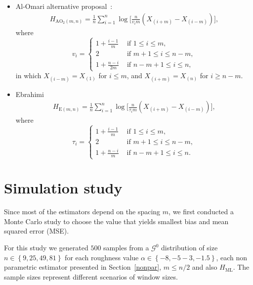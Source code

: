 \documentclass[journal]{IEEEtran}
\begin{document}
\begin{itemize}
		\item Al-Omari alternative proposal~\cite{AlOmari2016}:
		\label{MH}
		\begin{align}
			H_{\text{AO}_2(m,n)}=\frac{1}{n} \sum_{i=1}^{n} \log \Big[\frac{n}{v_{i} m}\left(X_{(i+m)}-X_{(i-m)}\right)\Big],
		\end{align}
		where
		\begin{equation*}
			v_{i}=\begin{cases}
				1+\frac{i-1}{m} & \text{ if }1 \leq i \leq m, \\
				2 & \text{ if } m+1 \leq i \leq n-m, \\
				1+\frac{n-i}{2 m} & \text{ if } n-m+1 \leq i \leq n,
			\end{cases}
		\end{equation*}
		in which $X_{(i-m)}=X_{(1)}$ for $i \leq m$, and $X_{(i+m)}=X_{(n)}$ for $i \geq n-m$.
		\item Ebrahimi~\cite{Ebrahimi94}
		\begin{align}
			H_{\text{E}(m,n)}=\frac{1}{n} \sum_{i=1}^{n} \log \Big[\frac{n}{\tau_{i} m}\left(X_{(i+m)}-X_{(i-m)}\right)\Big],
			\label{HE}
		\end{align}
		where
		\begin{equation*}
			\tau_{i}=\begin{cases}
				1+\frac{i-1}{m} & \text{ if }1 \leq i \leq m, \\
				2 & \text{ if } m+1 \leq i \leq n-m, \\
				1+\frac{n-i}{m} & \text{ if } n-m+1 \leq i \leq n.
			\end{cases}
		\end{equation*}
	\end{itemize}
	
	\section{Simulation study}\label{simulation}
	
	Since most of the estimators depend on the spacing $m$, we first conducted a Monte Carlo study  to choose the value that yields smallest bias and mean squared error (MSE). %
	
	For this study we generated $500$ samples from a $\mathcal{G}^0$ distribution of size $n \in\left\lbrace 9,25,49,81\right\rbrace $ for each roughness value $\alpha \in\left\lbrace -8,-5-3,-1.5\right\rbrace $, each non parametric estimator presented in Section~\ref{nonpar}, $m \leq {n}/{2}$ and also $H_{\text{ML}}$. 
	The sample sizes represent different scenarios of window sizes. 
	
\end{document}
